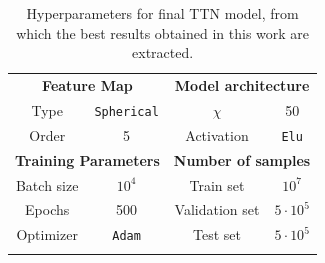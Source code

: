 \documentclass[../main/main.tex]{subfiles}
\begin{document}
\begin{table}[!h]
    \centering
    \begin{tabular}{cc||cc}
        \toprule
        \multicolumn{2}{c}{\textbf{Feature Map}} &
        \multicolumn{2}{c}{\textbf{Model architecture}} \\
        \colrule
        Type  & \texttt{Spherical}   & \( \chi \)   & 50     \\
        Order    & 5   & Activation    & \texttt{Elu}      \\
        \toprule
        \multicolumn{2}{c}{\textbf{Training Parameters}} &
        \multicolumn{2}{c}{\textbf{Number of samples}}  \\
        \colrule
        Batch size      & $10^4$  & Train set  & $10^7$     \\
        Epochs          & 500   & Validation set   & $5\cdot10^5$      \\
        Optimizer       & \texttt{Adam}   & Test set   & $5\cdot10^5$      \\
        \botrule
    \end{tabular}
    \caption{Hyperparameters for final TTN model, from which the best results obtained in this work are extracted.}
    \label{tab:results_final_parameters}
\end{table}


%        
%
\end{document}
